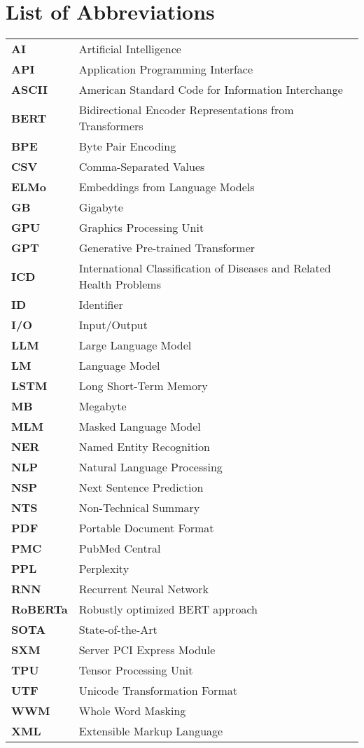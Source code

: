 \chapter*{List of Abbreviations}

\begin{tabular}{>{\bfseries}p{2cm} l}
    AI & Artificial Intelligence \\
    API & Application Programming Interface \\
    ASCII & American Standard Code for Information Interchange \\
    BERT & Bidirectional Encoder Representations from Transformers \\
    BPE & Byte Pair Encoding \\
    CSV & Comma-Separated Values \\
    ELMo & Embeddings from Language Models \\
    GB & Gigabyte \\
    GPU & Graphics Processing Unit \\
    GPT & Generative Pre-trained Transformer \\
    ICD & International Classification of Diseases and Related Health Problems \\
    ID & Identifier \\
    I/O & Input/Output \\
    LLM & Large Language Model \\
    LM & Language Model \\
    LSTM & Long Short-Term Memory \\
    MB & Megabyte \\
    MLM & Masked Language Model \\
    NER & Named Entity Recognition \\
    NLP & Natural Language Processing \\
    NSP & Next Sentence Prediction \\
    NTS & Non-Technical Summary \\
    PDF & Portable Document Format \\
    PMC & PubMed Central \\
    PPL & Perplexity \\
    RNN & Recurrent Neural Network \\
    RoBERTa & Robustly optimized BERT approach \\
    SOTA & State-of-the-Art \\
    SXM & Server PCI Express Module \\
    TPU & Tensor Processing Unit \\
    UTF & Unicode Transformation Format \\
    WWM & Whole Word Masking \\
    XML & Extensible Markup Language \\
\end{tabular}
